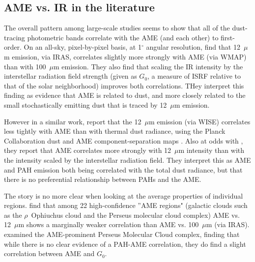        \subsection{AME vs. IR in the literature}
          The overall pattern among large-scale studies seems to show that all of the dust-tracing photometric bands correlate with the AME (and each other) to first-order.  On an all-sky, pixel-by-pixel basis, at 1$^{\circ}$ angular resolution, \cite{ysard10b} find that 12~$\mu$m emission, via IRAS, correlates slightly more strongly with AME (via WMAP) than with 100~$\mu$m emission.  They also find that scaling the IR intensity by the interstellar radiation field strength (given as $G_0$, a measure of ISRF relative to that of the solar neighborhood) improves both correlations. THey interpret this finding as evidence that AME is related to dust, and more closely related to the small stochastically emitting dust that is traced by 12~$\mu$m emission.

          However in a similar work, \cite{hensley16} report that the 12~$\mu$m emission (via WISE) correlates less tightly with AME than with thermal dust radiance, using the Planck Collaboration dust and AME component-separation maps \citep{planck15X}. Also at odds with \cite{ysard10b}, they report that AME correlates more strongly with 12~$\mu$m intensity than with the intensity scaled by the interstellar radiation field. They interpret this as AME and PAH emission both being correlated with the total dust radiance, but that there is no preferential relationship between PAHs and the AME.

         The story is no more clear when looking at the average properties of individual regions. \cite{planckXV} find that among 22 high-confidence ''AME regions" (galactic clouds such as the $\rho$~Ophiuchus cloud and the Perseus molecular cloud complex) AME vs. 12~$\mu$m  shows a marginally weaker correlation than AME vs. 100~$\mu$m (via IRAS). \cite{tibbs11} examined the AME-prominent Perseus Molecular Cloud complex, finding that while there is no clear evidence of a PAH-AME correlation, they do find a slight correlation between AME and  $G_0$.


